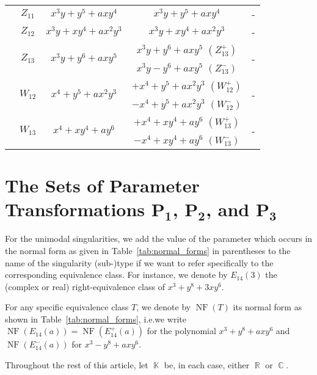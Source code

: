 \documentclass[noend]{amsproc}
\theoremstyle{definition}
\newcommand{\NF}[1]{\operatorname{NF}(#1)}
\DeclareMathOperator{\R}{\mathbb{R}}
\DeclareMathOperator{\C}{\mathbb{C}}
\DeclareMathOperator{\K}{\mathbb{K}}
\begin{document}
\begin{table}[tp]
\begin{tabular}{|c|c|c|c|c|}
& $Z_{11}$ & $x^3y+y^5+axy^4$ & $x^3y+y^5+axy^4$ & - \\ \cline{2-5}

& $Z_{12}$ & $x^3y+xy^4+ax^2y^3$ & $x^3y+xy^4+ax^2y^3$ & - \\ \cline{2-5}

& \multirow{2}{*}{$Z_{13}$} & \multirow{2}{*}{$x^3y+y^6+axy^5$}
  & $x^3y+y^6+axy^5$ $(Z_{13}^+)$ & \multirow{2}{*}{-} \\ \cline{4-4}
&&& $x^3y-y^6+axy^5$ $(Z_{13}^-)$ &                    \\ \cline{2-5}

& \multirow{2}{*}{$W_{12}$} & \multirow{2}{*}{$x^4+y^5+ax^2y^3$}
  & $+x^4+y^5+ax^2y^3$ $(W_{12}^+)$ & \multirow{2}{*}{-} \\ \cline{4-4}
&&& $-x^4+y^5+ax^2y^3$ $(W_{12}^-)$ &                    \\ \cline{2-5}

& \multirow{2}{*}{$W_{13}$} & \multirow{2}{*}{$x^4+xy^4+ay^6$}
  & $+x^4+xy^4+ay^6$ $(W_{13}^+)$ & \multirow{2}{*}{-} \\ \cline{4-4}
&&& $-x^4+xy^4+ay^6$ $(W_{13}^-)$ &                    \\ \hline

\end{tabular}
\end{table}


\section{The Sets of Parameter Transformations
$\boldsymbol{P_1}$, $\boldsymbol{P_2}$, and $\boldsymbol{P_3}$}

For the unimodal singularities, we add the value of the parameter which occurs
in the normal form as given in Table~\ref{tab:normal_forms} in parentheses to
the name of the singularity (sub-)type if we want to refer specifically to the
corresponding equivalence class. For instance, we denote by $E_{14}(3)$ the
(complex or real) right-equivalence class of $x^3+y^8+3xy^6$.

For any specific equivalence class $T$, we denote by $\NF{T}$ its normal form
as shown in Table~\ref{tab:normal_forms}, i.e.\@ we write
$\NF{E_{14}(a)} = \NF{E_{14}^+(a)}$ for the polynomial $x^3+y^8+axy^6$ and
$\NF{E_{14}^-(a)}$ for $x^3-y^8+axy^6$.

Throughout the rest of this article, let $\K$ be, in each case, either $\R$ or
$\C$.
\end{document}
